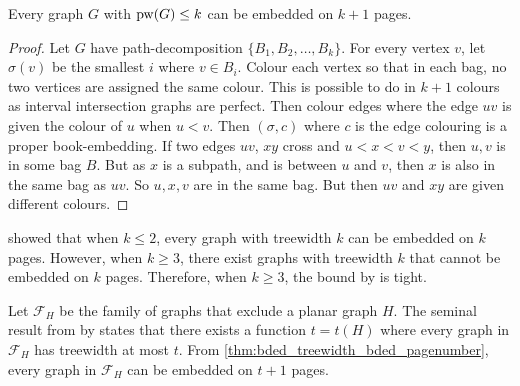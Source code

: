 \begin{theorem}\label{thm:pw_book_embedding}
	Every graph \(G\) with \(\operatorname{pw}(G) \leq k\) can be embedded on $k + 1$ pages.
\end{theorem}

\begin{proof}
	Let $G$ have path-decomposition $\{B_1, B_2, \ldots , B_k\}$. For every vertex $v$, let $\sigma(v)$ be the smallest $i$ where $v \in B_i$. Colour each vertex so that in each bag, no two vertices are assigned the same colour. This is possible to do in $k+1$ colours as interval intersection graphs are perfect. Then colour edges where the edge $uv$ is given the colour of $u$ when $u < v$. Then $(\sigma, c)$ where $c$ is the edge colouring is a proper book-embedding. If two edges $uv$, $xy$ cross and $u < x < v < y$, then $u,v$ is in some bag $B$. But as $x$ is a subpath, and is between $u$ and $v$, then $x$ is also in the same bag as $uv$. So $u,x,v$ are in the same bag. But then $uv$ and $xy$ are given different colours. 
\end{proof}

\textcite{dujmovicGraphTreewidthGeometric2007} showed that when $k \leq 2$, every graph with treewidth $k$ can be embedded on $k$ pages. However, when $k \geq 3$, there exist graphs with treewidth $k$ that cannot be embedded on $k$ pages. Therefore, when $k \geq 3$, the bound by \textcite{ganleyPagenumberTrees2001} is tight. 

Let $\mathcal{F}_H$ be the family of graphs that exclude a planar graph $H$. The seminal result from \cite{robertsonQuicklyExcludingPlanar1994} by \citeauthor{robertsonQuicklyExcludingPlanar1994} states that there exists a function $t = t(H)$ where every graph in $\mathcal{F}_H$ has treewidth at most $t$. From \cref{thm:bded_treewidth_bded_pagenumber}, every graph in  $\mathcal{F}_H$ can be embedded on $t + 1$ pages.